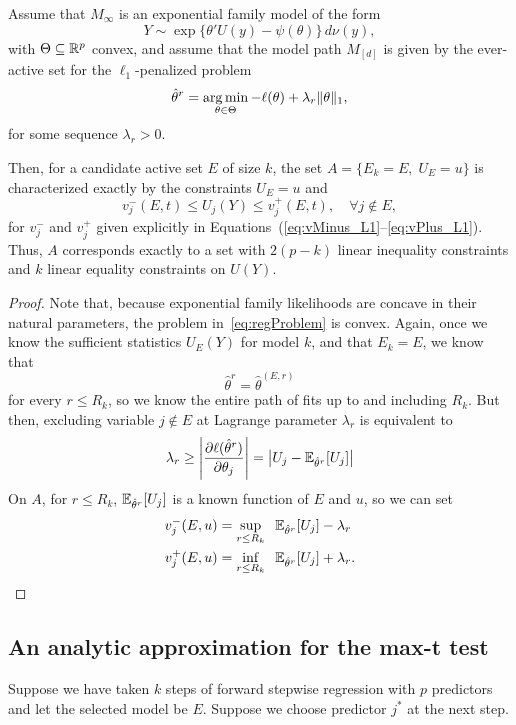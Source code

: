 \documentclass{article}
\begin{document}
\begin{theorem}
  Assume that $M_\infty$ is an exponential family model
  of the form
  \[
  Y \sim \exp\{ \theta'U(y) - \psi(\theta) \}\,d\nu(y),
  \]
  with $\Theta \subseteq \mathbb{R}^p$ convex, and assume
  that the model path $M_{[d]}$ is given 
  by the ever-active set for the $\ell_1$-penalized problem
  \begin{equation}\label{eq:regProblem}
  \hat\theta^r = \operatorname*{arg\,min}_{\theta\in \Theta} 
  -\ell(\theta) + \lambda_r\|\theta\|_1,
  \end{equation}
  for some sequence $\lambda_r > 0$.

  Then, for a candidate active set $E$ of size $k$, 
  the set $A = \{E_k = E, \;U_E = u\}$ is characterized 
  exactly by the constraints $U_E = u$ and
  \[
  v_j^-(E,t) \leq U_j(Y) \leq v_j^+(E,t), \quad\forall j \notin E,
  \]
  for $v_j^-$ and $v_j^+$ given explicitly in
  Equations~(\ref{eq:vMinus_L1}--\ref{eq:vPlus_L1}).
  Thus, $A$ corresponds exactly to 
  a set with $2(p-k)$ linear inequality constraints and $k$
  linear equality constraints on $U(Y)$.
\end{theorem}

\begin{proof}
  Note that, because exponential family likelihoods are concave in their natural parameters, the problem in~\eqref{eq:regProblem} is convex. Again, once we know the sufficient statistics $U_E(Y)$ for model $k$, and that $E_k=E$, we know that
  \[
  \hat\theta^r = \hat\theta^{(E,r)}
  \]
  for every $r \leq R_k$, so we know the entire path of fits up to and including $R_k$. But then, excluding variable $j \notin E$ at Lagrange parameter $\lambda_r$ is equivalent to
  \[
  \lambda_r \geq 
  \left| \frac{\partial \ell(\hat\theta^r)}{\partial \theta_j} \right|
  = \left|U_j - \mathbb{E}_{\hat\theta^r}[U_j]\right|
  \]
  On $A$, for $r \leq R_k$, 
  $\mathbb{E}_{\hat\theta^r}[U_j]$ is a known function of $E$ and $u$,
  so we can set
  \begin{align}\label{eq:vMinus_L1}
    v_j^-(E,u) &= \sup_{r \leq R_k} \;\; 
    \mathbb{E}_{\hat\theta^r}[U_j] - \lambda_r \\
    \label{eq:vPlus_L1}
    v_j^+(E,u) &= \inf_{r \leq R_k} \;\;
    \mathbb{E}_{\hat\theta^r}[U_j] + \lambda_r .
  \end{align}
\end{proof}


\subsection{An analytic approximation for the max-t test}
 Suppose we have taken $k$ steps of forward stepwise regression with $p$ predictors and let the selected model  
 be $E$. Suppose we choose predictor $j^*$ at the next step.
 
\end{document}
